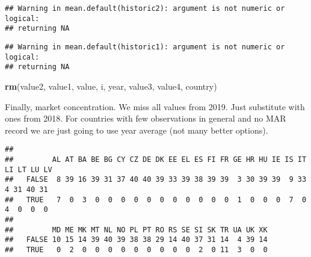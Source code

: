 \documentclass[
]{article}
\newenvironment{Shaded}{\begin{snugshade}}{\end{snugshade}}
\newcommand{\DecValTok}[1]{\textcolor[rgb]{0.00,0.00,0.81}{#1}}
\newcommand{\KeywordTok}[1]{\textcolor[rgb]{0.13,0.29,0.53}{\textbf{#1}}}
\newcommand{\NormalTok}[1]{#1}
\newcommand{\OperatorTok}[1]{\textcolor[rgb]{0.81,0.36,0.00}{\textbf{#1}}}
\newcommand{\StringTok}[1]{\textcolor[rgb]{0.31,0.60,0.02}{#1}}
\begin{document}
\begin{verbatim}
## Warning in mean.default(historic2): argument is not numeric or logical:
## returning NA
\end{verbatim}

\begin{verbatim}
## Warning in mean.default(historic1): argument is not numeric or logical:
## returning NA
\end{verbatim}

\begin{Shaded}
\begin{Highlighting}[]
\KeywordTok{rm}\NormalTok{(value2, value1, value, i, year, value3, value4, country)}
\end{Highlighting}
\end{Shaded}

Finally, market concentration. We miss all values from 2019. Just
substitute with ones from 2018. For countries with few observations in
general and no MAR record we are just going to use year average (not
many better options).

\begin{Shaded}
\end{Shaded}

\begin{verbatim}
##        
##         AL AT BA BE BG CY CZ DE DK EE EL ES FI FR GE HR HU IE IS IT LI LT LU LV
##   FALSE  8 39 16 39 31 37 40 40 39 33 39 38 39 39  3 30 39 39  9 33  4 31 40 31
##   TRUE   7  0  3  0  0  0  0  0  0  0  0  0  0  0  1  0  0  0  7  0  4  0  0  0
##        
##         MD ME MK MT NL NO PL PT RO RS SE SI SK TR UA UK XK
##   FALSE 10 15 14 39 40 39 38 38 29 14 40 37 31 14  4 39 14
##   TRUE   0  2  0  0  0  0  0  0  0  0  0  2  0 11  3  0  0
\end{verbatim}
\end{document}
